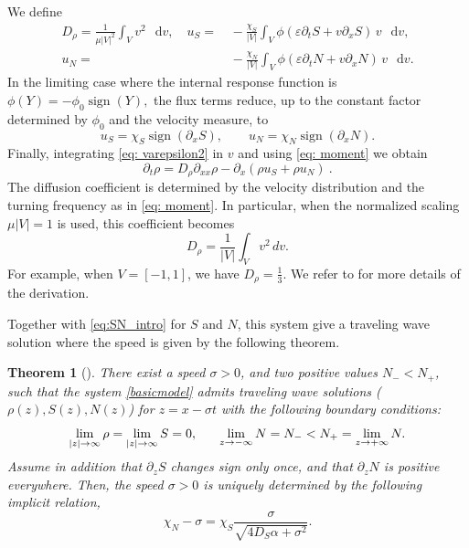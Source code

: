 \documentclass[11pt,twoside]{article}
\numberwithin{equation}{section}
\DeclareMathOperator{\sign}{sign}
\newcommand*\diff{\mathop{}\!\mathrm{d}}
\theoremstyle{plain}
\newtheorem{theorem}{Theorem}[section]
\theoremstyle{nonumberplain}
\begin{document}
We define
\begin{align}
    D_\rho
=
\frac{1}{\mu |V|^2}\int_V v^2\,\diff v,
\quad
u_S
=&\,
-\frac{\chi_S}{|V|}
\int_V \phi(\varepsilon\partial_t S+v\partial_x S)\,v\,\diff v,
\nonumber\\
u_N
=&\,
-\frac{\chi_N}{|V|}
\int_V \phi(\varepsilon\partial_t N+v\partial_x N)\,v\,\diff v .
\label{eq: moment}
\end{align}
In the limiting case where the internal response function is $\phi(Y)=-\phi_0\sign(Y),$
the flux terms reduce, up to the constant factor determined by
$\phi_0$ and the velocity measure, to \cite{calvez2019chemotactic}
\[
u_S=\chi_S\sign(\partial_x S),
\qquad
u_N=\chi_N\sign(\partial_x N).
\]
Finally, integrating \eqref{eq: varepsilon2} in ${v}$ and using \eqref{eq: moment} we obtain
\[
\partial_t\rho=D_\rho\partial_{xx}\rho-\partial_x(\rho u_S+\rho u_N)\ .
\]
{
The diffusion coefficient is determined by the velocity distribution and
the turning frequency as in \eqref{eq: moment}. 
In particular, when the normalized scaling \(\mu |V|=1\) is used, this
coefficient becomes
\begin{equation}
\label{def:Drho}
  D_\rho
=
\frac1{|V|}
\int_V v^2\,dv .  
\end{equation}
For example, when \( V = [-1,1] \), we have $D_\rho = \frac{1}{3}$.
}
We refer to \cite{emako2015existence,emako2016traveling} for more details of the derivation.

Together with \eqref{eq:SN_intro} for $S$ and $N$, this system give a traveling wave solution where the speed is given by the following theorem.

\begin{theorem}[\cite{calvez2019chemotactic}]\label{thmacro}
There exist a speed $\sigma>0$, and two positive values $N_- < N_+$, such that the system \eqref{basicmodel} admits traveling wave solutions ($\rho (z), S(z), N(z)$) for $z=x - \sigma t$ with the following boundary conditions:
\begin{equation}
    \lim_{|z| \to \infty} \rho = \lim_{|z| \to \infty} S = 0, \hspace{0.6cm} \lim_{z \to -\infty} N = N_- < N_+ = \lim_{z \to + \infty} N.
    \nonumber
\end{equation}
Assume in addition that $\partial_z S$ changes sign only once, and that $\partial_z N$ is positive everywhere. Then, the speed $\sigma > 0$ is uniquely determined by the following implicit relation,
\[
\chi_N - \sigma = \chi_S \frac{\sigma}{\sqrt{4 D_S \alpha + \sigma^2}}.
\]
\end{theorem}
\end{document}
